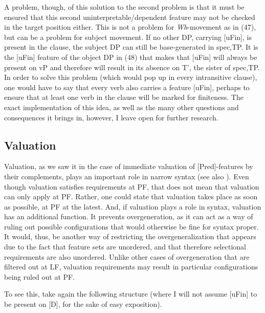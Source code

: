 \documentclass[output=paper
,modfonts
,nonflat]{langsci/langscibook}
\begin{document}
A problem, though, of this solution to the second problem is that it must be ensured that this second uninterpretable/dependent feature may not be checked in the target position either. This is not a problem for \textit{Wh}-movement as in (47), but can be a problem for subject movement. If no other DP, carrying [uFin], is present in the clause, the subject DP can still be base-generated in spec,TP. It is the [uFin] feature of the object DP in (48) that makes that [uFin] will always be present on vP and therefore will result in its absence on T’, the sister of spec,TP. In order to solve this problem (which would pop up in every intransitive clause), one would have to say that every verb also carries a feature [uFin], perhaps to ensure that at least one verb in the clause will be marked for finiteness. The exact implementation of this idea, as well as the many other questions and consequences it brings in, however, I leave open for further research.

\subsection{Valuation}
Valuation, as we saw it in the case of immediate valuation of [Pred]-features by their complements, plays an important role in narrow syntax (see also \citealt{Bjorkman_ZeijlstraTA}). Even though valuation satisfies requirements at PF, that does not mean that valuation can only apply at PF. Rather, one could state that valuation takes place as soon as possible, at PF at the latest. And, if valuation plays a role in syntax, valuation has an additional function. It prevents overgeneration, as it can act as a way of ruling out possible configurations that would otherwise be fine for syntax proper. It would, thus, be another way of restricting the overgeneralization that appears due to the fact that feature sets are unordered, and that therefore selectional requirements are also unordered. Unlike other cases of overgeneration that are filtered out at LF, valuation requirements may result in particular configurations being ruled out at PF.

To see this, take again the following structure (where I will not assume [uFin] to be present on [D], for the sake of easy exposition).
\end{document}
